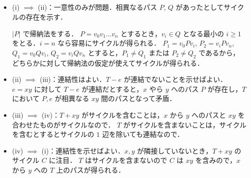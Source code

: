 \subsection{}
\begin{itemize}
 \item (i) $\implies$ (ii)：一意性のみが問題．相異なるパス $P$, $Q$ があったとしてサイクルの存在を示す．

 $|P|$ で帰納法をする．
 $P = v_0v_1\ldots v_n$ とするとき，$v_i \in Q$ となる最小の $i\geq 1$ をとる．$i = n$ なら容易にサイクルが得られる．
 $P_1 = v_0Pv_i$, $P_2 = v_iPv_n$,  $Q_1 = v_0Qv_i$, $Q_2 = v_iQv_n$ とすると，$P_1\neq Q_1$ または $P_2\neq Q_2$ であるから，
 どちらかに対して帰納法の仮定が使えてサイクルが得られる．
 \item (ii) $\implies$ (iii)：連結性はよい．$T-e$ が連結でないことを示せばよい．
 $e=xy$ に対して $T-e$ が連結だとすると，$x$ やら $y$ へのパス $P$ が存在し，$T$ において $P, e$ が相異なる $xy$ 間のパスとなって矛盾．
 \item (iii) $\implies$ (iv)：$T+xy$ がサイクルを含むことは，$x$ から $y$ へのパスと $xy$ を合わせたものがサイクルなので．
 $T$ がサイクルを含まないことは，サイクルを含むとするとサイクルの $1$ 辺を除いても連結なので．
 \item (iv) $\implies$ (i)：連結性を示せばよい．$x, y$ が隣接していないとき，$T+xy$ のサイクル $C$ に注目．
 $T$ はサイクルを含まないので $C$ は $xy$ を含みので，$x$ から $y$ への $T$ 上のパスが得られる．
\end{itemize}
